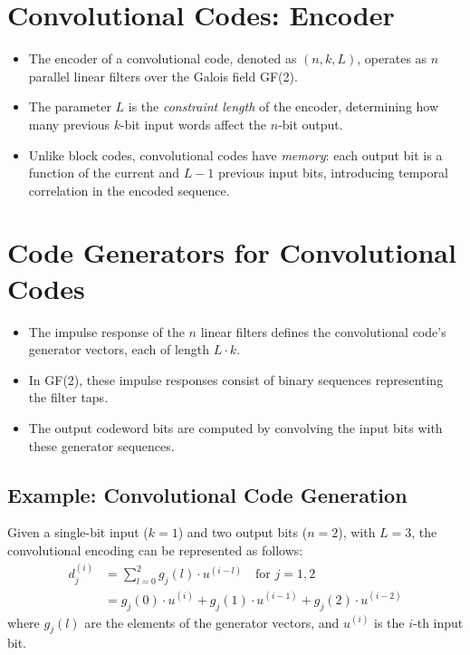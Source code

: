 \section*{Convolutional Codes: Encoder}

\begin{itemize}
    \item The encoder of a convolutional code, denoted as \((n, k, L)\), operates as \(n\) parallel linear filters over the Galois field GF(2).
    \item The parameter \(L\) is the \emph{constraint length} of the encoder, determining how many previous \(k\)-bit input words affect the \(n\)-bit output.
    \item Unlike block codes, convolutional codes have \emph{memory}: each output bit is a function of the current and \(L-1\) previous input bits, introducing temporal correlation in the encoded sequence.
\end{itemize}

\section*{Code Generators for Convolutional Codes}

\begin{itemize}
    \item The impulse response of the \(n\) linear filters defines the convolutional code's generator vectors, each of length \(L\cdot k\).
    \item In GF(2), these impulse responses consist of binary sequences representing the filter taps.
    \item The output codeword bits are computed by convolving the input bits with these generator sequences.
\end{itemize}

\subsection*{Example: Convolutional Code Generation}
Given a single-bit input (\(k=1\)) and two output bits (\(n=2\)), with \(L=3\), the convolutional encoding can be represented as follows:
\begin{align*}
    d^{(i)}_j &= \sum_{l=0}^{2} g_j(l)\cdot u^{(i-l)} \quad \text{for } j = 1,2 \\
    &= g_j(0)\cdot u^{(i)} + g_j(1)\cdot u^{(i-1)} + g_j(2)\cdot u^{(i-2)}
\end{align*}
where \(g_j(l)\) are the elements of the generator vectors, and \(u^{(i)}\) is the \(i\)-th input bit.

